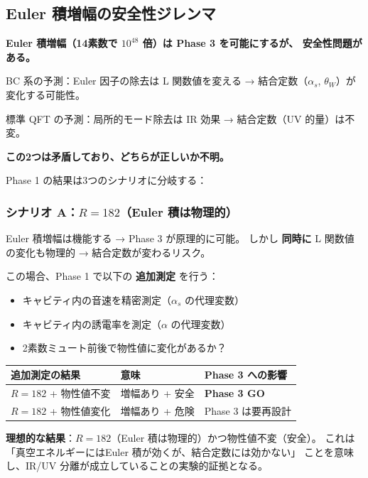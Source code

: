 \documentclass[11pt,a4paper]{article}
\begin{document}
\subsection{Euler 積増幅の安全性ジレンマ}

\begin{tcolorbox}[colback=yellow!5,colframe=yellow!60!black,title=★ 核心的ジレンマ ★]
\textbf{Euler 積増幅（14素数で $10^{48}$ 倍）は Phase 3 を可能にするが、
安全性問題がある。}

BC 系の予測：Euler 因子の除去は L 関数値を変える
→ 結合定数（$\alpha_s$, $\theta_W$）が変化する可能性。

標準 QFT の予測：局所的モード除去は IR 効果
→ 結合定数（UV 的量）は不変。

\textbf{この2つは矛盾しており、どちらが正しいか不明。}
\end{tcolorbox}

Phase 1 の結果は3つのシナリオに分岐する：

\subsubsection{シナリオ A：$R = 182$（Euler 積は物理的）}

Euler 積増幅は機能する → Phase 3 が原理的に可能。
しかし \textbf{同時に} L 関数値の変化も物理的 → 結合定数が変わるリスク。

この場合、Phase 1 で以下の \textbf{追加測定} を行う：
\begin{itemize}
\item キャビティ内の音速を精密測定（$\alpha_s$ の代理変数）
\item キャビティ内の誘電率を測定（$\alpha$ の代理変数）
\item 2素数ミュート前後で物性値に変化があるか？
\end{itemize}

\begin{center}
\begin{tabular}{lll}
\toprule
追加測定の結果 & 意味 & Phase 3 への影響 \\
\midrule
$R = 182$ + 物性値不変 & 増幅あり + 安全 & \textbf{Phase 3 GO} \\
$R = 182$ + 物性値変化 & 増幅あり + 危険 & Phase 3 は要再設計 \\
\bottomrule
\end{tabular}
\end{center}

\textbf{理想的な結果}：$R = 182$（Euler 積は物理的）かつ物性値不変（安全）。
これは「真空エネルギーにはEuler 積が効くが、結合定数には効かない」
ことを意味し、IR/UV 分離が成立していることの実験的証拠となる。
\end{document}

